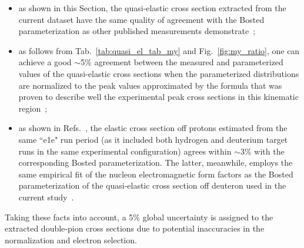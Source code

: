 \begin{itemize}

\item as shown in this Section, the quasi-elastic cross section extracted from the current dataset have the same quality of agreement with the Bosted parameterization as other published measurements demonstrate~\cite{note_QE_peak};

\item as follows from Tab.~\ref{tab:quasi_el_tab_my} and Fig.~\ref{fig:my_ratio}, one can achieve a good $\sim$5\% agreement between the measured and parameterized values of the quasi-elastic cross sections when the parameterized distributions are normalized to the peak values approximated by the formula that was proven to describe well the experimental peak cross sections in this kinematic region~\cite{note_QE_peak};

\item as shown in Refs.~\cite{Fed_an_note:2017,Fed_paper_2018}, the elastic cross section off protons estimated from the same ``e1e" run period (as it included both hydrogen and deuterium target runs in the same experimental configuration) agrees within $\sim$3\% with the corresponding Bosted parameterization. The latter, meanwhile, employs the same empirical fit of the nucleon electromagnetic form factors as the Bosted parameterization of the quasi-elastic cross section off deuteron used in the current study~\cite{Bosted:1994tm}.  





\end{itemize}

Taking these facts into account, a 5\% global uncertainty is assigned to the extracted double-pion cross sections due to potential inaccuracies in the normalization and electron selection.


